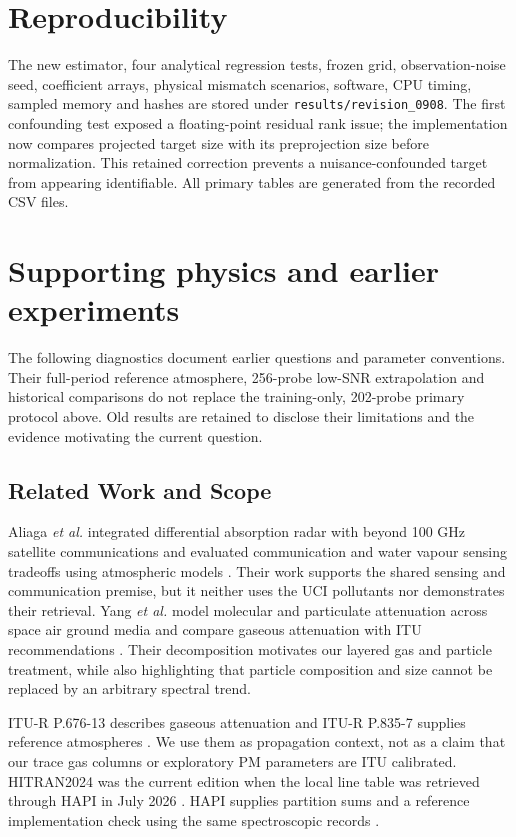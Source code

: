\documentclass[conference]{IEEEtran}
\begin{document}
\section*{Reproducibility}
The new estimator, four analytical regression tests, frozen grid, observation-noise seed, coefficient arrays, physical mismatch scenarios, software, CPU timing, sampled memory and hashes are stored under \texttt{results/revision\_0908}. The first confounding test exposed a floating-point residual rank issue; the implementation now compares projected target size with its preprojection size before normalization. This retained correction prevents a nuisance-confounded target from appearing identifiable. All primary tables are generated from the recorded CSV files.

\clearpage
\appendices
\section{Supporting physics and earlier experiments}
The following diagnostics document earlier questions and parameter conventions. Their full-period reference atmosphere, 256-probe low-SNR extrapolation and historical comparisons do not replace the training-only, 202-probe primary protocol above. Old results are retained to disclose their limitations and the evidence motivating the current question.
\subsection{Related Work and Scope}

Aliaga \emph{et al.} integrated differential absorption radar with beyond 100 GHz satellite communications and evaluated communication and water vapour sensing tradeoffs using atmospheric models \cite{aliaga2024dar}. Their work supports the shared sensing and communication premise, but it neither uses the UCI pollutants nor demonstrates their retrieval. Yang \emph{et al.} model molecular and particulate attenuation across space air ground media and compare gaseous attenuation with ITU recommendations \cite{yang2024attenuation}. Their decomposition motivates our layered gas and particle treatment, while also highlighting that particle composition and size cannot be replaced by an arbitrary spectral trend.

ITU-R P.676-13 describes gaseous attenuation and ITU-R P.835-7 supplies reference atmospheres \cite{itu676,itu835}. We use them as propagation context, not as a claim that our trace gas columns or exploratory PM parameters are ITU calibrated. HITRAN2024 was the current edition when the local line table was retrieved through HAPI in July 2026 \cite{gordon2026hitran}. HAPI supplies partition sums and a reference implementation check using the same spectroscopic records \cite{kochanov2016hapi}.
\end{document}
